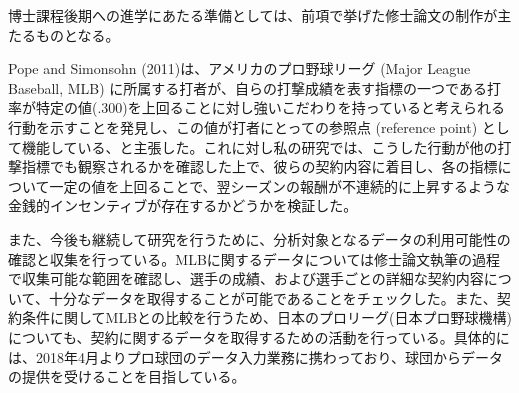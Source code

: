\documentclass[dvipdfmx, 14pt]{jsarticle}
\begin{document}
博士課程後期への進学にあたる準備としては、前項で挙げた修士論文の制作が主たるものとなる。

Pope and Simonsohn (2011)は、アメリカのプロ野球リーグ (Major League Baseball, MLB) に所属する打者が、自らの打撃成績を表す指標の一つである打率が特定の値(.300)を上回ることに対し強いこだわりを持っていると考えられる行動を示すことを発見し、この値が打者にとっての参照点 (reference point) として機能している、と主張した。これに対し私の研究では、こうした行動が他の打撃指標でも観察されるかを確認した上で、彼らの契約内容に着目し、各の指標について一定の値を上回ることで、翌シーズンの報酬が不連続的に上昇するような金銭的インセンティブが存在するかどうかを検証した。

また、今後も継続して研究を行うために、分析対象となるデータの利用可能性の確認と収集を行っている。MLBに関するデータについては修士論文執筆の過程で収集可能な範囲を確認し、選手の成績、および選手ごとの詳細な契約内容について、十分なデータを取得することが可能であることをチェックした。また、契約条件に関してMLBとの比較を行うため、日本のプロリーグ(日本プロ野球機構)についても、契約に関するデータを取得するための活動を行っている。具体的には、2018年4月よりプロ球団のデータ入力業務に携わっており、球団からデータの提供を受けることを目指している。
\end{document}
